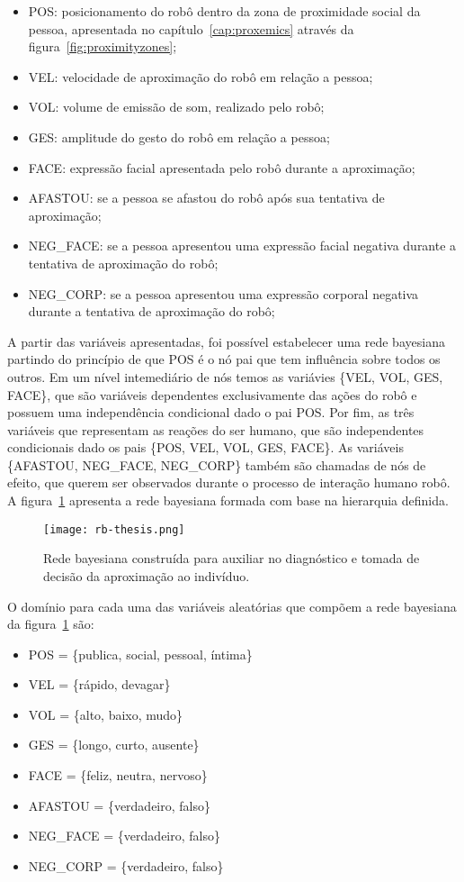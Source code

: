 \begin{itemize}
	\item POS: posicionamento do robô dentro da zona de proximidade social da pessoa, apresentada no capítulo~\ref{cap:proxemics} através da figura~\ref{fig:proximityzones};
	\item VEL: velocidade de aproximação do robô em relação a pessoa;
	\item VOL: volume de emissão de som, realizado pelo robô;
	\item GES: amplitude do gesto do robô em relação a pessoa;
	\item FACE: expressão facial apresentada pelo robô durante a aproximação;
	\item AFASTOU: se a pessoa se afastou do robô após sua tentativa de aproximação;
	\item NEG\_FACE: se a pessoa apresentou uma expressão facial negativa durante a tentativa de aproximação do robô;
	\item NEG\_CORP: se a pessoa apresentou uma expressão corporal negativa durante a tentativa de aproximação do robô;
\end{itemize}

A partir das variáveis apresentadas, foi possível estabelecer uma rede bayesiana partindo do princípio de que POS é o nó pai que tem influência sobre todos os outros. Em um nível intemediário de nós temos as variávies \{VEL, VOL, GES, FACE\}, que são variáveis dependentes exclusivamente das ações do robô e possuem uma independência condicional dado o pai POS. Por fim, as três variáveis que representam as reações do ser humano, que são independentes condicionais dado os pais \{POS, VEL, VOL, GES, FACE\}. As variáveis \{AFASTOU, NEG\_FACE, NEG\_CORP\} também são chamadas de nós de efeito, que querem ser observados durante o processo de interação humano robô. A figura~\ref{fig:rb} apresenta a rede bayesiana formada com base na hierarquia definida.

\begin{figure}[ht!]
	\centering
	\texttt{[image: rb-thesis.png]}
	\caption{Rede bayesiana construída para auxiliar no diagnóstico e tomada de decisão da aproximação ao indivíduo.}
	\label{fig:rb}
\end{figure}

O domínio para cada uma das variáveis aleatórias que compõem a rede bayesiana da figura~\ref{fig:rb} são:

\begin{itemize}
	\item POS = \{publica, social, pessoal, íntima\}
	\item VEL = \{rápido, devagar\}
	\item VOL = \{alto, baixo, mudo\}
	\item GES = \{longo, curto, ausente\}
	\item FACE = \{feliz, neutra, nervoso\}
	\item AFASTOU = \{verdadeiro, falso\}
	\item NEG\_FACE = \{verdadeiro, falso\}
	\item NEG\_CORP = \{verdadeiro, falso\}
\end{itemize}

